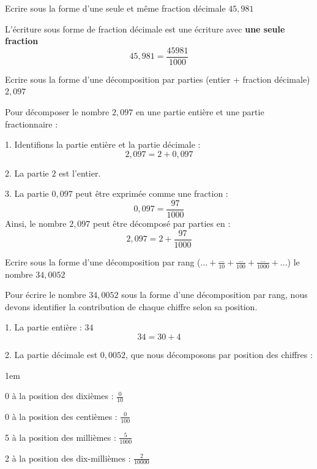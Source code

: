 \documentclass[answers]{exam}
\begin{document}
\begin{questions}
  \question[0.5] Ecrire sous la forme d'une seule et même fraction décimale $45,981$

\begin{solution}
  L'écriture sous forme de fraction décimale est une écriture avec \textbf{une seule fraction}
\[
45,981 = \frac{45981}{1000}
\]
\end{solution}

  \question[0.5] Ecrire sous la forme d'une décomposition par parties (entier + fraction décimale) $2,097$

\begin{solution}
Pour décomposer le nombre \(2,097\) en une partie entière et une partie fractionnaire :

1. Identifions la partie entière et la partie décimale :
   \[
   2,097 = 2 + 0,097
   \]

2. La partie \(2\) est l'entier.

3. La partie \(0,097\) peut être exprimée comme une fraction :
   \[
   0,097 = \frac{97}{1000}
   \]
  Ainsi, le nombre \(2,097\) peut être décomposé par parties en :
\[
2,097 = 2 + \frac{97}{1000}
\]
\end{solution}

  \question[0.5] Ecrire sous la forme d'une décomposition par rang ($... + \frac{...}{10} + \frac{...}{100} + \frac{...}{1000} + ...$) le nombre $34,0052$

\begin{solution}
Pour écrire le nombre \(34,0052\) sous la forme d'une décomposition par rang, nous devons identifier la contribution de chaque chiffre selon sa position.

1. La partie entière : \(34\)
    \[
    34 = 30 + 4 
    \]

2. La partie décimale est \(0,0052\), que nous décomposons par position des chiffres :
    \begin{addmargin}[4em]{1em}
    \begin{compactitem}
        \item 0 à la position des dixièmes : \(\frac{0}{10}\)
        \item 0 à la position des centièmes : \(\frac{0}{100}\)
        \item 5 à la position des millièmes : \(\frac{5}{1000}\)
        \item 2 à la position des dix-millièmes : \(\frac{2}{10000}\)
    \end{compactitem}
    \end{addmargin}


\end{solution}
\end{questions}
\end{document}

